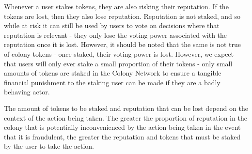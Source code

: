 Whenever a user stakes tokens, they are also risking their reputation. If the tokens are lost, then they also lose reputation. Reputation is not staked, and so while at risk it can still be used by users to vote on decisions where that reputation is relevant - they only lose the voting power associated with the reputation once it is lost. However, it should be noted that the same is not true of colony tokens - once staked, their voting power is lost. However, we expect that users will only ever stake a small proportion of their tokens - only small amounts of tokens are staked in the Colony Network to ensure a tangible financial punishment to the staking user can be made if they are a badly behaving actor.

The amount of tokens to be staked and reputation that can be lost depend on the context of the action being taken. The greater the proportion of reputation in the colony that is potentially inconvenienced by the action being taken in the event that it is fraudulent, the greater the reputation and tokens that must be staked by the user to take the action.





